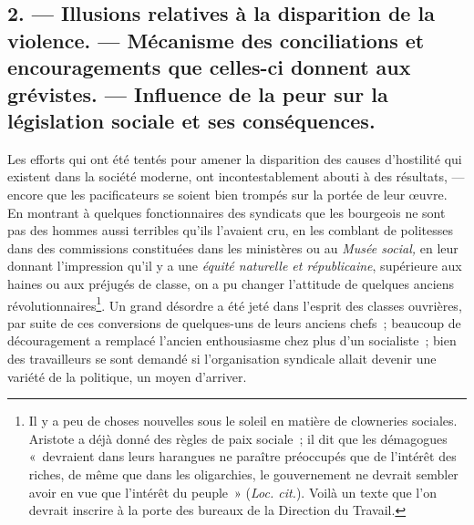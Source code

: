 \documentclass[french,twoside]{book} %
\begin{document}
 \subsection[{2. — Illusions relatives à la disparition de la violence. — Mécanisme des conciliations et encouragements que celles-ci donnent aux grévistes. — Influence de la peur sur la législation sociale et ses conséquences.}]{2. — Illusions relatives à la disparition de la violence. — Mécanisme des conciliations et encouragements que celles-ci donnent aux grévistes. — Influence de la peur sur la législation sociale et ses conséquences.}
\label{p05}
\noindent Les efforts qui ont été tentés pour amener la disparition des causes d’hostilité qui existent dans la société moderne, ont incontestablement abouti à des résultats, — encore que les pacificateurs se soient bien trompés sur la portée de leur œuvre. En montrant à quelques fonctionnaires des syndicats que les bourgeois ne sont pas des hommes aussi terribles qu’ils l’avaient cru, en les comblant de politesses dans des commissions constituées dans les ministères ou au \emph{Musée social,} en leur donnant l’impression qu’il y a une \emph{équité naturelle et républicaine}, supérieure aux haines ou aux préjugés de classe, on a pu changer l’attitude de quelques anciens révolutionnaires\footnote{ \noindent Il y a peu de choses nouvelles sous le soleil en matière de clowneries sociales. Aristote a déjà donné des règles de paix sociale ; il dit que les démagogues « devraient dans leurs harangues ne paraître préoccupés que de l’intérêt des riches, de même que dans les oligarchies, le gouvernement ne devrait sembler avoir en vue que l’intérêt du peuple » (\emph{Loc. cit.}). Voilà un texte que l’on devrait inscrire à la porte des bureaux de la Direction du Travail.
 }. Un grand désordre a été jeté dans l’esprit des classes ouvrières, par suite de ces conversions de quelques-uns de leurs anciens chefs ; beaucoup de découragement a remplacé l’ancien enthousiasme chez plus d’un socialiste ; bien des travailleurs se sont demandé si l’organisation syndicale allait devenir une variété de la politique, un moyen d’arriver.\par
\end{document}
